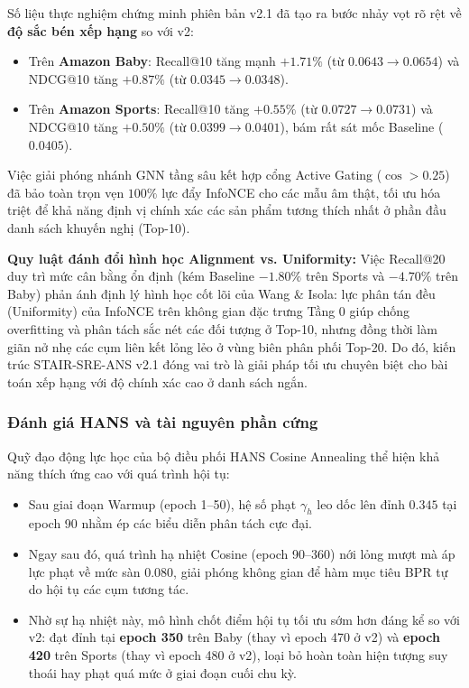 Số liệu thực nghiệm chứng minh phiên bản v2.1 đã tạo ra bước nhảy vọt rõ rệt về \textbf{độ sắc bén xếp hạng} so với v2:
\begin{itemize}[leftmargin=*]
    \item Trên \textbf{Amazon Baby}: Recall@10 tăng mạnh $+1.71\%$ (từ $0.0643 \to 0.0654$) và NDCG@10 tăng $+0.87\%$ (từ $0.0345 \to 0.0348$).
    \item Trên \textbf{Amazon Sports}: Recall@10 tăng $+0.55\%$ (từ $0.0727 \to 0.0731$) và NDCG@10 tăng $+0.50\%$ (từ $0.0399 \to 0.0401$), bám rất sát mốc Baseline ($0.0405$).
\end{itemize}
Việc giải phóng nhánh GNN tầng sâu kết hợp cổng Active Gating ($\cos > 0.25$) đã bảo toàn trọn vẹn $100\%$ lực đẩy InfoNCE cho các mẫu âm thật, tối ưu hóa triệt để khả năng định vị chính xác các sản phẩm tương thích nhất ở phần đầu danh sách khuyến nghị (Top-10).

\noindent\textbf{Quy luật đánh đổi hình học Alignment vs. Uniformity:}
Việc Recall@20 duy trì mức cân bằng ổn định (kém Baseline $-1.80\%$ trên Sports và $-4.70\%$ trên Baby) phản ánh định lý hình học cốt lõi của Wang \& Isola: lực phân tán đều (Uniformity) của InfoNCE trên không gian đặc trưng Tầng 0 giúp chống overfitting và phân tách sắc nét các đối tượng ở Top-10, nhưng đồng thời làm giãn nở nhẹ các cụm liên kết lỏng lẻo ở vùng biên phân phối Top-20. Do đó, kiến trúc STAIR-SRE-ANS v2.1 đóng vai trò là giải pháp tối ưu chuyên biệt cho bài toán xếp hạng với độ chính xác cao ở danh sách ngắn.

\subsubsection{Đánh giá HANS và tài nguyên phần cứng}

Quỹ đạo động lực học của bộ điều phối HANS Cosine Annealing thể hiện khả năng thích ứng cao với quá trình hội tụ:
\begin{itemize}[leftmargin=*]
    \item Sau giai đoạn Warmup (epoch 1--50), hệ số phạt $\gamma_h$ leo dốc lên đỉnh $0.345$ tại epoch 90 nhằm ép các biểu diễn phân tách cực đại.
    \item Ngay sau đó, quá trình hạ nhiệt Cosine (epoch 90--360) nới lỏng mượt mà áp lực phạt về mức sàn $0.080$, giải phóng không gian để hàm mục tiêu BPR tự do hội tụ các cụm tương tác.
    \item Nhờ sự hạ nhiệt này, mô hình chốt điểm hội tụ tối ưu sớm hơn đáng kể so với v2: đạt đỉnh tại \textbf{epoch 350} trên Baby (thay vì epoch 470 ở v2) và \textbf{epoch 420} trên Sports (thay vì epoch 480 ở v2), loại bỏ hoàn toàn hiện tượng suy thoái hay phạt quá mức ở giai đoạn cuối chu kỳ.
\end{itemize}

